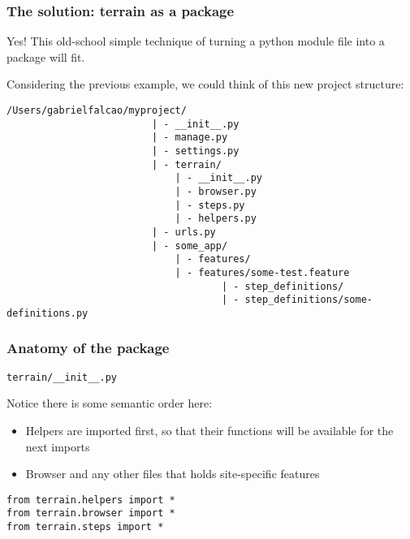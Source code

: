 \documentclass[letterpaper]{article}
\begin{document}
\subsubsection*{The solution: terrain as a package}

Yes! This old-school simple technique of turning a python module file
into a package will fit.

Considering the previous example, we could think of this new project
structure:

\newpage

\footnotesize
\begin{verbatim}
/Users/gabrielfalcao/myproject/
                         | - __init__.py
                         | - manage.py
                         | - settings.py
                         | - terrain/
                             | - __init__.py
                             | - browser.py
                             | - steps.py
                             | - helpers.py
                         | - urls.py
                         | - some_app/
                             | - features/
                             | - features/some-test.feature
                                     | - step_definitions/
                                     | - step_definitions/some-definitions.py
\end{verbatim}
\normalsize

\subsubsection*{Anatomy of the package}

\hspace{2pt}

\noindent
\large\texttt{terrain/\_\_init\_\_.py}\footnotesize

\hspace{1pt}

\noindent

Notice there is some semantic order here:
\begin{itemize}
\item{Helpers are imported first, so that their functions will be available for the next imports}
\item{Browser and any other files that holds site-specific features}
\end{itemize}
\begin{verbatim}
from terrain.helpers import *
from terrain.browser import *
from terrain.steps import *
\end{verbatim}
\end{document}
